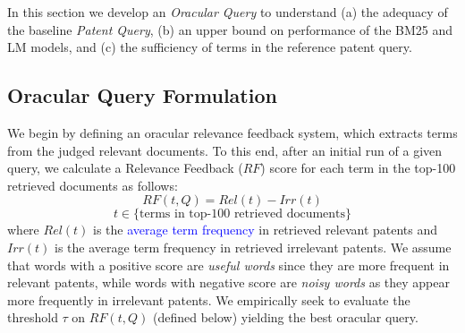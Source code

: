%

In this section we develop an \emph{Oracular Query} to understand (a)
the adequacy of the baseline
\emph{Patent Query}, (b) an upper bound on performance of the
BM25 and LM models, and (c) the sufficiency of terms in the reference
patent query.

\subsection{Oracular Query Formulation}

We begin by defining an oracular relevance feedback system, which
extracts terms from the judged relevant documents. To this end, after an initial run of a given query, we
calculate a Relevance Feedback ($\mathit{RF}$) score for each term in the top-100
retrieved documents as follows:
\begin{equation}
RF(t,Q)=Rel(t)-Irr(t) 
 \label{eq:score}
\end{equation}\vspace*{-5ex}
\begin{displaymath}t\in \lbrace \mbox{terms in top-100 retrieved documents}\rbrace\end{displaymath}
where $ \mathit{Rel(t)} $ is the \textcolor{blue}{average term frequency} in retrieved relevant patents and $ \mathit{Irr(t)} $ is the average term frequency in retrieved irrelevant patents. We assume that words with a positive score are \emph{useful words} since they are more frequent in relevant patents, while words with negative score are \emph{noisy words} as they appear more frequently in irrelevant patents. We empirically seek to evaluate the threshold $\tau$ on $RF(t,Q)$ (defined below) yielding the best oracular query.

